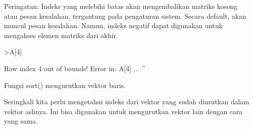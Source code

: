 \documentclass[a4paper,10pt]{article}
\begin{document}
\begin{eulernotebook}
\begin{eulercomment}
\begin{eulercomment}
\begin{eulercomment}
\begin{eulercomment}
\begin{eulercomment}
\begin{eulercomment}
\begin{eulercomment}
\begin{eulercomment}
\begin{eulercomment}
\begin{eulercomment}
\begin{eulercomment}
\begin{eulercomment}
\begin{eulercomment}
\begin{eulercomment}
\begin{eulercomment}
\begin{eulercomment}
\begin{eulercomment}
\begin{eulercomment}
\begin{eulercomment}
\begin{eulercomment}
\begin{eulercomment}
\begin{eulercomment}
\begin{eulercomment}
Peringatan: Indeks yang melebihi batas akan mengembalikan matriks
kosong atau pesan kesalahan, tergantung pada pengaturan sistem. Secara
default, akan muncul pesan kesalahan. Namun, indeks negatif dapat
digunakan untuk mengakses elemen matriks dari akhir.
\end{eulercomment}
\begin{eulerprompt}
>A[4]
\end{eulerprompt}
\begin{euleroutput}
  Row index 4 out of bounds!
  Error in:
  A[4] ...
      ^
\end{euleroutput}
\begin{eulercomment}
\begin{eulercomment}
\begin{eulercomment}
Fungsi sort() mengurutkan vektor baris.

Seringkali kita perlu mengetahui indeks dari vektor yang sudah
diurutkan dalam vektor aslinya. Ini bisa digunakan untuk mengurutkan
vektor lain dengan cara yang sama.


\end{eulercomment}
\end{eulercomment}
\end{eulercomment}
\end{eulercomment}
\end{eulercomment}
\end{eulercomment}
\end{eulercomment}
\end{eulercomment}
\end{eulercomment}
\end{eulercomment}
\end{eulercomment}
\end{eulercomment}
\end{eulercomment}
\end{eulercomment}
\end{eulercomment}
\end{eulercomment}
\end{eulercomment}
\end{eulercomment}
\end{eulercomment}
\end{eulercomment}
\end{eulercomment}
\end{eulercomment}
\end{eulercomment}
\end{eulercomment}
\end{eulercomment}
\end{eulernotebook}
\end{document}
